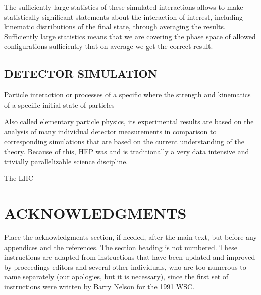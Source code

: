 \documentclass{wscpaperproc}
\theoremstyle{wsc}
\begin{document}
The sufficiently large statistics of these simulated interactions allows to make statistically significant statements about the interaction of interest, including kinematic distributions of the final state, through averaging the results. Sufficiently large statistics means that we are covering the phase space of allowed configurations sufficiently that on average we get the correct result.

\subsection{DETECTOR SIMULATION} 
\label{subsec:detectorsimulation}






Particle interaction or processes of a specific  where the strength and kinematics of a specific initial state of particles




















Also called elementary particle physics, its experimental results are based on the analysis of many individual detector measurements in comparison to corresponding simulations that are based on the current understanding of the theory. Because of this, HEP was and is traditionally a very data intensive and trivially parallelizable science discipline.

The LHC~\cite{1748-0221-3-08-S08001}

\section*{ACKNOWLEDGMENTS}
Place the acknowledgments section, if needed, after the main text, but before any appendices and the references. The section heading is not numbered.
These instructions are adapted from instructions that have been updated and improved by proceedings editors and several other individuals, who are too numerous to name separately (our apologies, but it is necessary), since the first set of instructions were written by Barry Nelson for the 1991 WSC.

\appendix




\end{document}

